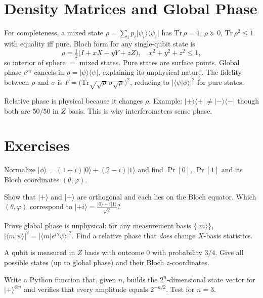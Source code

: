 \section{Density Matrices and Global Phase}
For completeness, a mixed state $\rho=\sum_i p_i\lvert\psi_i\rangle\langle\psi_i\rvert$ has $\mathrm{Tr}\,\rho=1$, $\rho\succeq0$, $\mathrm{Tr}\,\rho^2\le1$ with equality iff pure. Bloch form for any single-qubit state is
\begin{equation}
\rho=\tfrac12\bigl(I+xX+yY+zZ\bigr),\quad x^2+y^2+z^2\le1,
\end{equation}
so interior of sphere $=$ mixed states. Pure states are surface points. Global phase $e^{i\gamma}$ cancels in $\rho=\lvert\psi\rangle\langle\psi\rvert$, explaining its unphysical nature. The fidelity between $\rho$ and $\sigma$ is $F=\bigl(\mathrm{Tr}\sqrt{\sqrt\rho\,\sigma\sqrt\rho}\bigr)^2$, reducing to $|\langle\psi|\phi\rangle|^2$ for pure states.
\begin{remark}
Relative phase is physical because it changes $\rho$. Example: $\lvert+\rangle\langle+\rvert\neq\lvert-\rangle\langle-\rvert$ though both are $50/50$ in $Z$ basis. This is why interferometers sense phase.
\end{remark}

\section{Exercises}
\begin{exercise}
Normalize $\lvert\phi\rangle= (1+i)\lvert0\rangle + (2-i)\lvert1\rangle$ and find $\Pr[0]$, $\Pr[1]$ and its Bloch coordinates $(\theta,\varphi)$.
\end{exercise}
\begin{exercise}
Show that $\lvert+\rangle$ and $\lvert-\rangle$ are orthogonal and each lies on the Bloch equator. Which $(\theta,\varphi)$ correspond to $\lvert+i\rangle=\tfrac{\lvert0\rangle+i\lvert1\rangle}{\sqrt2}$?
\end{exercise}
\begin{exercise}
Prove global phase is unphysical: for any measurement basis $\{\lvert m\rangle\}$, $|\langle m\vert\psi\rangle|^2=|\langle m|e^{i\gamma}\psi\rangle|^2$. Find a relative phase that \emph{does} change $X$-basis statistics.
\end{exercise}
\begin{exercise}
A qubit is measured in $Z$ basis with outcome $0$ with probability $3/4$. Give all possible states (up to global phase) and their Bloch $z$-coordinates.
\end{exercise}
\begin{exercise}
Write a Python function that, given $n$, builds the $2^n$-dimensional state vector for $\lvert+\rangle^{\otimes n}$ and verifies that every amplitude equals $2^{-n/2}$. Test for $n=3$.
\end{exercise}
